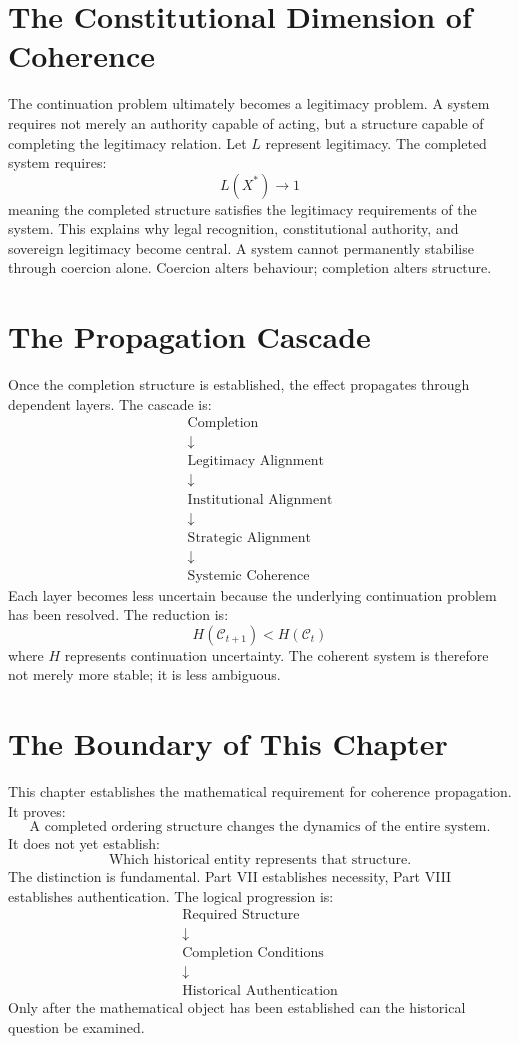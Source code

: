\documentclass[11pt,openany]{book}
\theoremstyle{plain}
\theoremstyle{definition}
\begin{document}
\section{The Constitutional Dimension of Coherence}

The continuation problem ultimately becomes a legitimacy problem. A system requires not merely an authority capable of acting, but a structure capable of completing the legitimacy relation. Let \(L\) represent legitimacy. The completed system requires:
\[
L(X^*) \to 1
\]
meaning the completed structure satisfies the legitimacy requirements of the system. This explains why legal recognition, constitutional authority, and sovereign legitimacy become central. A system cannot permanently stabilise through coercion alone. Coercion alters behaviour; completion alters structure.

\section{The Propagation Cascade}

Once the completion structure is established, the effect propagates through dependent layers. The cascade is:
\[
\begin{gathered}
\text{Completion} \\
\downarrow \\
\text{Legitimacy Alignment} \\
\downarrow \\
\text{Institutional Alignment} \\
\downarrow \\
\text{Strategic Alignment} \\
\downarrow \\
\text{Systemic Coherence}
\end{gathered}
\]
Each layer becomes less uncertain because the underlying continuation problem has been resolved. The reduction is:
\[
H(\mathcal{C}_{t+1}) < H(\mathcal{C}_t)
\]
where \(H\) represents continuation uncertainty. The coherent system is therefore not merely more stable; it is less ambiguous.

\section{The Boundary of This Chapter}

This chapter establishes the mathematical requirement for coherence propagation. It proves:
\[
\boxed{
\text{A completed ordering structure changes the dynamics of the entire system.}
}
\]
It does not yet establish:
\[
\boxed{
\text{Which historical entity represents that structure.}
}
\]
The distinction is fundamental. Part VII establishes necessity, Part VIII establishes authentication. The logical progression is:
\[
\begin{gathered}
\text{Required Structure} \\
\downarrow \\
\text{Completion Conditions} \\
\downarrow \\
\text{Historical Authentication}
\end{gathered}
\]
Only after the mathematical object has been established can the historical question be examined.
\end{document}
